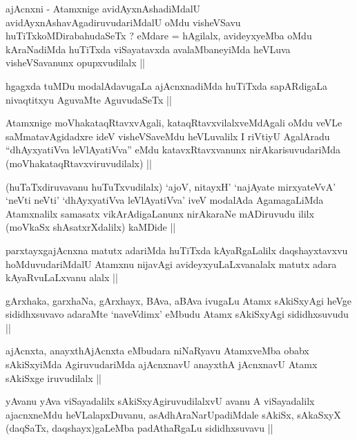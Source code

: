 \begin{artha}
ajAcnxni - Atamxnige avidAyxnAshadiMdalU
avidAyxnAshavAgadiruvudariMdalU oMdu visheVSavu
huTiTxkoMDirabahudaSeTx ? eMdare = hAgilalx, avideyxyeMba oMdu
kAraNadiMda huTiTxda viSayatavxda avalaMbaneyiMda heVLuva
visheVSavanunx opupxvudilalx ||
\end{artha}

\begin{artha}
hgagxda tuMDu modalAdavugaLa ajAcnxnadiMda huTiTxda sapARdigaLa
nivaqtitxyu AguvaMte AguvudaSeTx ||
\end{artha}


\begin{artha}
Atamxnige moVhakataqRtavxvAgali, kataqRtavxvilalxveMdAgali oMdu veVLe
saMmatavAgidadxre ideV visheVSaveMdu heVLuvalilx I riVtiyU AgalAradu
``dhAyxyatiVva leVlAyatiVva'' eMdu katavxRtavxvanunx
nirAkarisuvudariMda (moVhakataqRtavxviruvudilalx) ||
\end{artha}


\begin{artha}
(huTaTxdiruvavanu huTuTxvudilalx) `ajoV, nitayxH' `najAyate
  mirxyateVvA' `neVti neVti' `dhAyxyatiVva leVlAyatiVva' iveV modalAda
  AgamagaLiMda Atamxnalilx samasatx vikArAdigaLanunx nirAkaraNe
  mADiruvudu ililx (moVkaSx shAsatxrXdalilx) kaMDide ||
\end{artha}

\begin{artha}
parxtayxgajAcnxna matutx adariMda huTiTxda kAyaRgaLalilx
daqshayxtavxvu hoMduvudariMdalU Atamxnu nijavAgi avideyxyuLaLxvanalalx
matutx adara kAyaRvuLaLxvanu alalx ||
\end{artha}

\begin{artha}
gArxhaka, garxhaNa, gArxhayx, BAva, aBAva ivugaLu Atamx sAkiSxyAgi
heVge sididhxsuvavo adaraMte `naveVdimx' eMbudu Atamx sAkiSxyAgi
sididhxsuvudu ||
\end{artha}

\begin{artha}
ajAcnxta, anayxthAjAcnxta eMbudara niNaRyavu AtamxveMba obabx
sAkiSxyiMda AgiruvudariMda ajAcnxnavU anayxthA jAcnxnavU Atamx
sAkiSxge iruvudilalx ||
\end{artha}

\begin{artha}
yAvanu yAva viSayadalilx sAkiSxyAgiruvudilalxvU avanu A viSayadalilx
ajacnxneMdu heVLalapxDuvanu, asAdhAraNarUpadiMdale sAkiSx, sAkaSxyX
(daqSaTx, daqshayx)gaLeMba padAthaRgaLu sididhxsuvavu ||
\end{artha}

